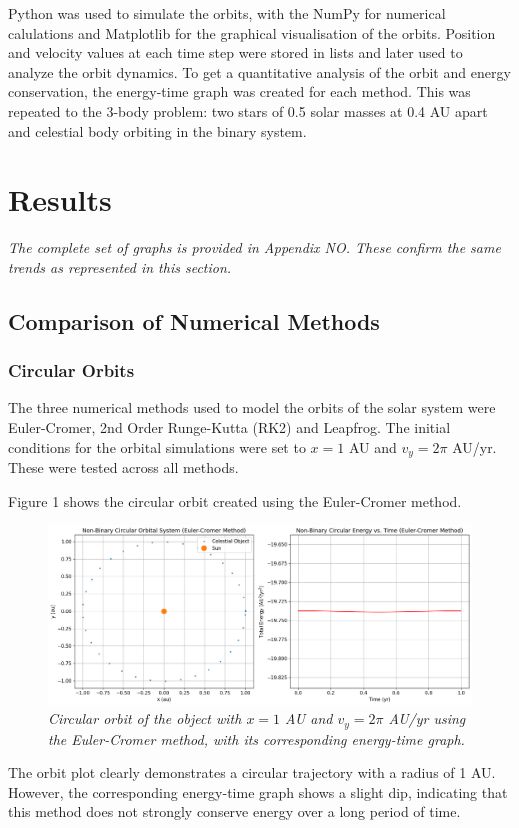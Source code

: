 \documentclass[11 pt, a4paper, twocolumn]{article}
\begin{document}
Python was used to simulate the orbits, with the NumPy for numerical calulations and Matplotlib for the
graphical visualisation of the orbits. Position and velocity values at each time step were stored in
lists and later used to analyze the orbit dynamics. To get a quantitative analysis of the orbit and energy
conservation, the energy-time graph was created for each method. This was repeated to the 3-body problem: 
two stars of 0.5 solar masses at 0.4 AU apart and celestial body orbiting in the binary system.

\section{Results}
\textit{The complete set of graphs is provided in Appendix NO. These confirm the same trends as 
represented in this section.}

\subsection{Comparison of Numerical Methods}
\subsubsection{Circular Orbits}
The three numerical methods used to model the orbits of the solar system were Euler-Cromer, 
2nd Order Runge-Kutta (RK2) and Leapfrog. The initial conditions for the orbital simulations 
were set to $x = 1$ AU and $v_y=2\pi$ AU/yr. These were tested across all methods.

Figure 1 shows the circular orbit created using the Euler-Cromer method.
\begin{figure}[H]
  \includegraphics[width=1\linewidth]{Euler cromer/eulercromercircular.png}
  \centering
  \caption{\textit{Circular orbit of the object with $x = 1$ AU and $v_y = 2\pi$ AU/yr using 
  the Euler-Cromer method, with its corresponding energy-time graph.}} 
\end{figure}
\vspace{-3em}
The orbit plot clearly demonstrates a circular trajectory with a radius of 1 AU. However, the 
corresponding energy-time graph shows a slight dip, indicating that this method does not strongly 
conserve energy over a long period of time. 
\end{document}
